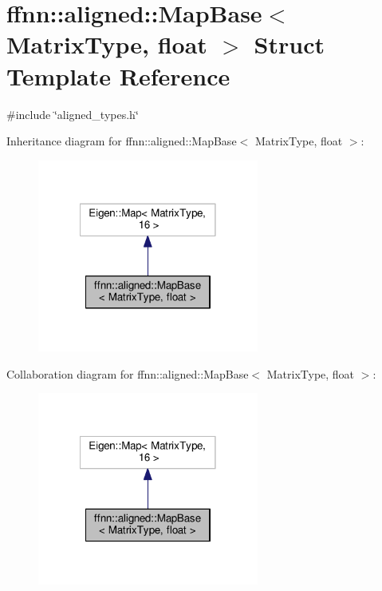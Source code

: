 \hypertarget{structffnn_1_1aligned_1_1_map_base_3_01_matrix_type_00_01float_01_4}{\section{ffnn\-:\-:aligned\-:\-:Map\-Base$<$ Matrix\-Type, float $>$ Struct Template Reference}
\label{structffnn_1_1aligned_1_1_map_base_3_01_matrix_type_00_01float_01_4}
}


{\ttfamily \#include \char`\"{}aligned\-\_\-types.\-h\char`\"{}}



Inheritance diagram for ffnn\-:\-:aligned\-:\-:Map\-Base$<$ Matrix\-Type, float $>$\-:
\nopagebreak
\begin{figure}[H]
\begin{center}
\leavevmode
\includegraphics[width=206pt]{structffnn_1_1aligned_1_1_map_base_3_01_matrix_type_00_01float_01_4__inherit__graph}
\end{center}
\end{figure}


Collaboration diagram for ffnn\-:\-:aligned\-:\-:Map\-Base$<$ Matrix\-Type, float $>$\-:
\nopagebreak
\begin{figure}[H]
\begin{center}
\leavevmode
\includegraphics[width=206pt]{structffnn_1_1aligned_1_1_map_base_3_01_matrix_type_00_01float_01_4__coll__graph}
\end{center}
\end{figure}
